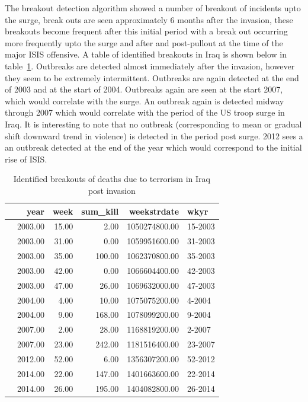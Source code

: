 The breakout detection algorithm showed a number of  breakout of incidents upto the surge, break outs are seen approximately 6 months after the invasion, these breakouts become frequent after this initial period with a break out occurring more frequently upto the surge and after and post-pullout at the time of the major ISIS offensive. A table of identified breakouts in Iraq is shown below in table~\ref{tab:labelsiraq}. 
Outbreaks are detected almost immediately after the invasion, however they seem to be extremely intermittent. Outbreaks are again detected at the end of 2003 and at the start of 2004. Outbreaks again are seen at the start 2007, which would correlate with the surge. An outbreak again is detected midway through 2007 which would correlate with the period of the US troop surge in Iraq. It is interesting to note that no outbreak (corresponding to mean or gradual shift downward trend in violence) is detected in the period post surge. 2012 sees a an outbreak detected at the end of the year which would correspond to the initial rise of ISIS.
 
\begin{table}[ht]
\centering
\begin{tabular}{rrrrrl}
  \hline
 & year & week & sum\_kill & weekstrdate & wkyr \\ 
  \hline
 & 2003.00 & 15.00 & 2.00 & 1050274800.00 & 15-2003 \\ 
 & 2003.00 & 31.00 & 0.00 & 1059951600.00 & 31-2003 \\ 
 & 2003.00 & 35.00 & 100.00 & 1062370800.00 & 35-2003 \\ 
 & 2003.00 & 42.00 & 0.00 & 1066604400.00 & 42-2003 \\ 
 & 2003.00 & 47.00 & 26.00 & 1069632000.00 & 47-2003 \\ 
 & 2004.00 & 4.00 & 10.00 & 1075075200.00 & 4-2004 \\ 
 & 2004.00 & 9.00 & 168.00 & 1078099200.00 & 9-2004 \\ 
 & 2007.00 & 2.00 & 28.00 & 1168819200.00 & 2-2007 \\ 
 & 2007.00 & 23.00 & 242.00 & 1181516400.00 & 23-2007 \\ 
 & 2012.00 & 52.00 & 6.00 & 1356307200.00 & 52-2012 \\ 
 & 2014.00 & 22.00 & 147.00 & 1401663600.00 & 22-2014 \\ 
 & 2014.00 & 26.00 & 195.00 & 1404082800.00 & 26-2014 \\ 
   \hline
\end{tabular}
\caption{Identified breakouts of deaths due to terrorism in Iraq post invasion}
\label{tab:labelsiraq} 
\end{table}

